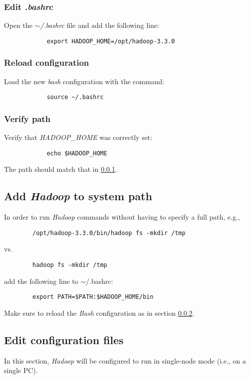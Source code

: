 \documentclass{article}
\begin{document}
        \subsubsection{Edit \emph{.bashrc}}
        \label{subsec:hadoophome}
        Open the \emph{$\sim$/.bashrc} file and add the following line:
        \begin{verbatim}
            export HADOOP_HOME=/opt/hadoop-3.3.0
        \end{verbatim}

        \subsubsection{Reload configuration}
        \label{subsec:reloadbash}
        Load the new \emph{bash} configuration with the command:
        \begin{verbatim}
            source ~/.bashrc
        \end{verbatim}

        \subsubsection{Verify path}
        Verify that \emph{HADOOP\_HOME} was correctly set:
        \begin{verbatim}
            echo $HADOOP_HOME
        \end{verbatim}
        The path should match that in \ref{subsec:hadoophome}.
    
    \subsection{Add \emph{Hadoop} to system path}
    In order to run \emph{Hadoop} commands without having to specify a full path, e.g.,
    \begin{verbatim}
        /opt/hadoop-3.3.0/bin/hadoop fs -mkdir /tmp
    \end{verbatim}
    vs.
    \begin{verbatim}
        hadoop fs -mkdir /tmp
    \end{verbatim}
    add the following line to $\sim$/.bashrc:
    \begin{verbatim}
        export PATH=$PATH:$HADOOP_HOME/bin
    \end{verbatim}
    Make sure to reload the \emph{Bash} configuration as in section \ref{subsec:reloadbash}.

    \subsection{Edit configuration files}
    In this section, \emph{Hadoop} will be configured to run in single-node mode (i.e., on a single PC).
\end{document}
